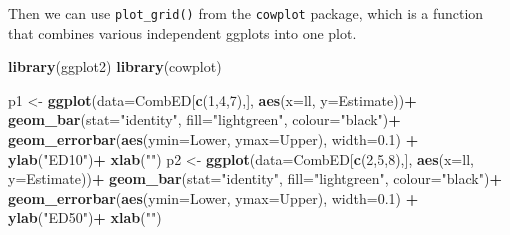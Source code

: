 \documentclass[letterpaper,]{book}
\newenvironment{Shaded}{\begin{snugshade}}{\end{snugshade}}
\newcommand{\DataTypeTok}[1]{\textcolor[rgb]{0.13,0.29,0.53}{#1}}
\newcommand{\DecValTok}[1]{\textcolor[rgb]{0.00,0.00,0.81}{#1}}
\newcommand{\FloatTok}[1]{\textcolor[rgb]{0.00,0.00,0.81}{#1}}
\newcommand{\KeywordTok}[1]{\textcolor[rgb]{0.13,0.29,0.53}{\textbf{#1}}}
\newcommand{\NormalTok}[1]{#1}
\newcommand{\OperatorTok}[1]{\textcolor[rgb]{0.81,0.36,0.00}{\textbf{#1}}}
\newcommand{\StringTok}[1]{\textcolor[rgb]{0.31,0.60,0.02}{#1}}
\begin{document}
Then we can use \texttt{plot\_grid()} from the \texttt{cowplot} package, which is a function that combines various independent ggplots into one plot.



\begin{Shaded}
\begin{Highlighting}[]
\KeywordTok{library}\NormalTok{(ggplot2)}
\KeywordTok{library}\NormalTok{(cowplot)}

\NormalTok{p1 <-}\StringTok{ }\KeywordTok{ggplot}\NormalTok{(}\DataTypeTok{data=}\NormalTok{CombED[}\KeywordTok{c}\NormalTok{(}\DecValTok{1}\NormalTok{,}\DecValTok{4}\NormalTok{,}\DecValTok{7}\NormalTok{),], }\KeywordTok{aes}\NormalTok{(}\DataTypeTok{x=}\NormalTok{ll, }\DataTypeTok{y=}\NormalTok{Estimate))}\OperatorTok{+}
\StringTok{ }\KeywordTok{geom_bar}\NormalTok{(}\DataTypeTok{stat=}\StringTok{"identity"}\NormalTok{, }\DataTypeTok{fill=}\StringTok{"lightgreen"}\NormalTok{, }\DataTypeTok{colour=}\StringTok{"black"}\NormalTok{)}\OperatorTok{+}
\StringTok{  }\KeywordTok{geom_errorbar}\NormalTok{(}\KeywordTok{aes}\NormalTok{(}\DataTypeTok{ymin=}\NormalTok{Lower, }\DataTypeTok{ymax=}\NormalTok{Upper), }\DataTypeTok{width=}\FloatTok{0.1}\NormalTok{) }\OperatorTok{+}
\StringTok{  }\KeywordTok{ylab}\NormalTok{(}\StringTok{"ED10"}\NormalTok{)}\OperatorTok{+}
\StringTok{  }\KeywordTok{xlab}\NormalTok{(}\StringTok{""}\NormalTok{)}
\NormalTok{p2 <-}\StringTok{ }\KeywordTok{ggplot}\NormalTok{(}\DataTypeTok{data=}\NormalTok{CombED[}\KeywordTok{c}\NormalTok{(}\DecValTok{2}\NormalTok{,}\DecValTok{5}\NormalTok{,}\DecValTok{8}\NormalTok{),], }\KeywordTok{aes}\NormalTok{(}\DataTypeTok{x=}\NormalTok{ll, }\DataTypeTok{y=}\NormalTok{Estimate))}\OperatorTok{+}
\StringTok{  }\KeywordTok{geom_bar}\NormalTok{(}\DataTypeTok{stat=}\StringTok{"identity"}\NormalTok{, }\DataTypeTok{fill=}\StringTok{"lightgreen"}\NormalTok{, }\DataTypeTok{colour=}\StringTok{"black"}\NormalTok{)}\OperatorTok{+}
\StringTok{  }\KeywordTok{geom_errorbar}\NormalTok{(}\KeywordTok{aes}\NormalTok{(}\DataTypeTok{ymin=}\NormalTok{Lower, }\DataTypeTok{ymax=}\NormalTok{Upper), }\DataTypeTok{width=}\FloatTok{0.1}\NormalTok{) }\OperatorTok{+}
\StringTok{  }\KeywordTok{ylab}\NormalTok{(}\StringTok{"ED50"}\NormalTok{)}\OperatorTok{+}
\StringTok{  }\KeywordTok{xlab}\NormalTok{(}\StringTok{""}\NormalTok{)}


\end{Highlighting}
\end{Shaded}
\end{document}

